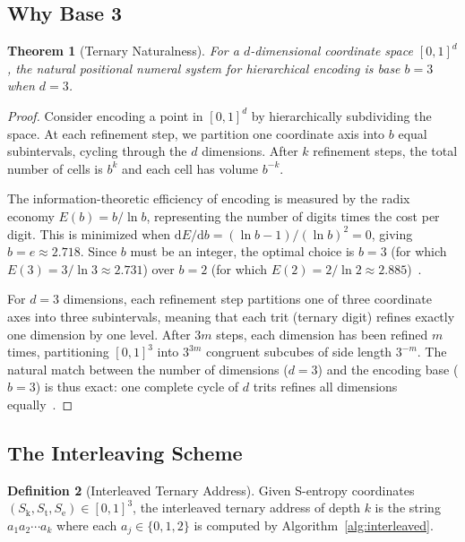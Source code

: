 \documentclass[11pt,twocolumn,a4paper]{article}
\newtheorem{theorem}{Theorem}[section]
\theoremstyle{definition}
\newtheorem{definition}[theorem]{Definition}
\theoremstyle{remark}
\newcommand{\Sk}{S_{\mathrm{k}}}
\newcommand{\St}{S_{\mathrm{t}}}
\newcommand{\Se}{S_{\mathrm{e}}}
\begin{document}
\subsection{Why Base 3}
\label{sec:why-base-3}

\begin{theorem}[Ternary Naturalness]
\label{thm:ternary-natural}
For a $d$-dimensional coordinate space $[0,1]^d$, the natural positional numeral system for hierarchical encoding is base $b = 3$ when $d = 3$.
\end{theorem}

\begin{proof}
Consider encoding a point in $[0,1]^d$ by hierarchically subdividing the space. At each refinement step, we partition one coordinate axis into $b$ equal subintervals, cycling through the $d$ dimensions. After $k$ refinement steps, the total number of cells is $b^k$ and each cell has volume $b^{-k}$.

The information-theoretic efficiency of encoding is measured by the radix economy $E(b) = b/\ln b$, representing the number of digits times the cost per digit. This is minimized when $\mathrm{d}E/\mathrm{d}b = (\ln b - 1)/(\ln b)^2 = 0$, giving $b = e \approx 2.718$. Since $b$ must be an integer, the optimal choice is $b = 3$ (for which $E(3) = 3/\ln 3 \approx 2.731$) over $b = 2$ (for which $E(2) = 2/\ln 2 \approx 2.885$)~\citep{brusentsov1962, knuth1998}.

For $d = 3$ dimensions, each refinement step partitions one of three coordinate axes into three subintervals, meaning that each trit (ternary digit) refines exactly one dimension by one level. After $3m$ steps, each dimension has been refined $m$ times, partitioning $[0,1]^3$ into $3^{3m}$ congruent subcubes of side length $3^{-m}$. The natural match between the number of dimensions ($d = 3$) and the encoding base ($b = 3$) is thus exact: one complete cycle of $d$ trits refines all dimensions equally~\citep{brusentsov1962}.
\end{proof}

\subsection{The Interleaving Scheme}
\label{sec:interleaving}

\begin{definition}[Interleaved Ternary Address]
\label{def:interleaved-address}
Given S-entropy coordinates $(\Sk, \St, \Se) \in [0,1]^3$, the interleaved ternary address of depth $k$ is the string $a_1 a_2 \cdots a_k$ where each $a_j \in \{0, 1, 2\}$ is computed by Algorithm~\ref{alg:interleaved}.
\end{definition}
\end{document}
